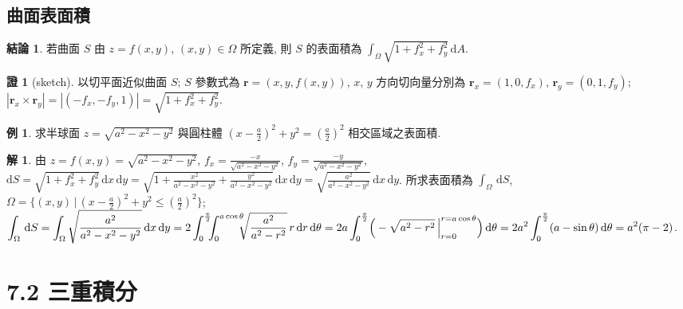 \documentclass[12pt]{extarticle}
\newcommand{\ds}{\displaystyle}
\theoremstyle{definition}
\newtheorem*{fact}{結論}
\newtheorem*{ex}{例}
\newtheorem*{sol}{解}
\newtheorem*{prf}{證}
\newcommand{\vr}{\mathbf{r}}
\begin{document}
\subsection*{曲面表面積}

\begin{fact}
  若曲面 $S$ 由 $z = f(x, y)$, $(x, y)\in\Omega$ 所定義, 則 $S$ 的表面積為 $\ds\int_\Omega\sqrt{1 + f_x^2 + f_y^2}\,\text{d}A$.
\end{fact}

\begin{prf}[sketch]
  以切平面近似曲面 $S$; $S$ 參數式為 $\vr = (x, y, f(x, y))$, $x$, $y$ 方向切向量分別為 $\vr_x = (1, 0, f_x)$, $\vr_y = (0, 1, f_y)$; $\ds|\vr_x\times\vr_y| = |(-f_x, -f_y, 1)| = \sqrt{1 + f_x^2 + f_y^2}$. 
\end{prf}

\begin{ex}
  求半球面 $z = \sqrt{a^2 - x^2 - y^2}$ 與圓柱體 $(x - \frac{a}{2})^2 + y^2 = (\frac{a}{2})^2$ 相交區域之表面積.
\end{ex}

\begin{sol}
  由 $z = f(x, y) = \sqrt{a^2 - x^2 - y^2}$, $\ds f_x = \frac{-x}{\sqrt{a^2 - x^2 - y^2}}$, $\ds f_y = \frac{-y}{\sqrt{a^2 - x^2 - y^2}}$, $\ds\text{d}S = \sqrt{1 + f_x^2 + f_y^2}\,\text{d}x\,\text{d}y = \sqrt{1 + \frac{x^2}{a^2 - x^2 - y^2} + \frac{y^2}{a^2 - x^2 - y^2}}\,\text{d}x\,\text{d}y = \sqrt{\frac{a^2}{a^2 - x^2 - y^2}}\,\text{d}x\,\text{d}y$. 所求表面積為 $\ds\int_\Omega\,\text{d}S$, $\Omega = \big\{(x,y)\,\big|\,(x - \frac{a}{2})^2 + y^2 \leqslant (\frac{a}{2})^2\big\}$; $\ds\int_\Omega\,\text{d}S = \int_\Omega\sqrt{\frac{a^2}{a^2 - x^2 - y^2}}\,\text{d}x\,\text{d}y = 2\int_0^{\frac{\pi}{2}}\!\!\!\int_0^{a\cos\theta}\!\!\!\!\sqrt{\frac{a^2}{a^2 - r^2}}\,r\,\text{d}r\,\text{d}\theta \\ = 2a\int_0^{\frac{\pi}{2}}\!\Big(-\sqrt{a^2 - r^2}\,\Big|_{r = 0}^{r = a\cos\theta}\Big)\,\text{d}\theta = 2a^2\int_0^{\frac{\pi}{2}}(a - \sin\theta)\,\text{d}\theta = a^2(\pi - 2)$.  
\end{sol}

\section*{7.2 三重積分}

%
\end{document}
